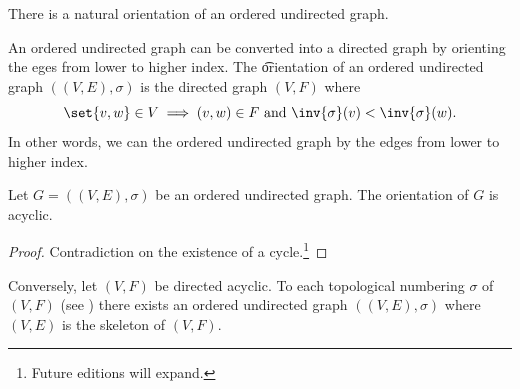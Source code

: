 

There is a natural orientation of an ordered undirected graph.


An ordered undirected graph can be converted into a directed graph by orienting the eges from lower to higher index.
The \t{orientation} of an ordered undirected graph $((V, E),\sigma)$ is the directed graph $(V, F)$ where
\[
  \set{v, w} \in V \implies (v, w) \in F \text{ and } \inv{\sigma}(v) < \inv{\sigma}(w).
\]
In other words, we can  the ordered undirected graph by  the edges from lower to higher index.

\begin{proposition}
  Let $G = ((V, E), \sigma)$ be an ordered undirected graph.
  The orientation of $G$ is acyclic.
  \begin{proof}
    Contradiction on the existence of a cycle.\footnote{Future editions will expand.}
  \end{proof}
\end{proposition}

Conversely, let $(V, F)$ be directed acyclic.
To each topological numbering $\sigma$ of $(V, F)$ (see ) there exists an ordered undirected graph $((V, E), \sigma)$ where $(V, E)$ is the skeleton of $(V, F)$.


